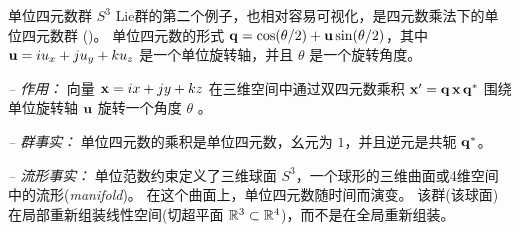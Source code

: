 
\begin{fexample}	{单位四元数群 $S^3$}
\label{ex:S3_intro}
Lie群的第二个例子，也相对容易可视化，是四元数乘法下的单位四元数群 ()。
单位四元数的形式 ${\bf q}=\cos(\theta/2)+{\bf u}\sin(\theta/2)$，其中 ${\bf u}=iu_x+ju_y+ku_z$ 是一个单位旋转轴，并且 $\theta$ 是一个旋转角度。

\emph{-- 作用：}
向量 ${\bf x}=ix+jy+kz$ 在三维空间中通过双四元数乘积 ${\bf x}'={\bf q}\,{\bf x}\,{\bf q}^*$ 围绕单位旋转轴 ${\bf u}$ 旋转一个角度 $\theta$ 。

\emph{-- 群事实：} 
单位四元数的乘积是单位四元数，幺元为 $1$，并且逆元是共轭 ${\bf q}^*$。

\emph{-- 流形事实：} 
单位范数约束定义了三维球面 $S^3$，一个球形的三维曲面或4维空间中的流形(\emph{manifold})。
在这个曲面上，单位四元数随时间而演变。
该群(该球面)在局部重新组装线性空间(切超平面 ${\mathbb R}^3\subset{\mathbb R}^4$)，而不是在全局重新组装。
\end{fexample}
